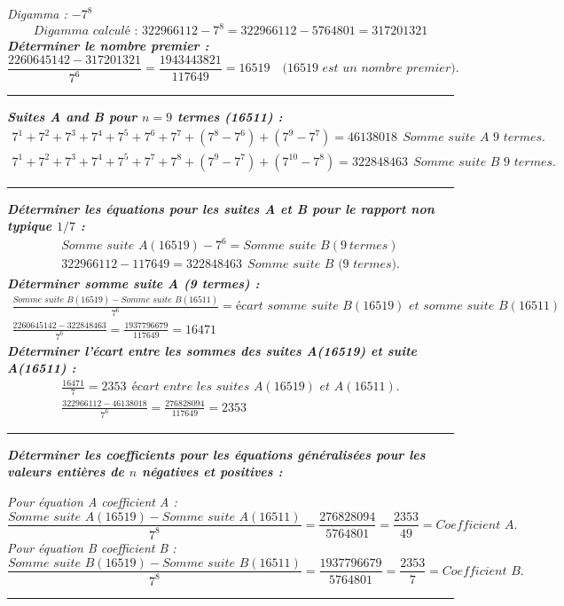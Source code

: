 \documentclass[11pt,a4paper]{article}
\begin{document}
\noindent\textit{Digamma : $-7^{8}$}
\[
\textit{Digamma calculé : }322966112-7^{8}=322966112-5764801=317201321
\]
\noindent\textbf{\textit{Déterminer le nombre premier :}}
\[
\frac{2260645142-317201321}{7^{6}}=\frac{1943443821}{117649}=16519\quad\textit{(16519 est un nombre premier).}
\]
\noindent\rule{\linewidth}{0.4pt}

\noindent\textbf{\textit{Suites A and B pour $n=9$ termes (16511) :}}
\begin{gather*}
7^{1}+7^{2}+7^{3}+7^{4}+7^{5}+7^{6}+7^{7}+(7^{8}-7^{6})+(7^{9}-7^{7})=46138018\ \ \textit{Somme suite A 9 termes.}\\
7^{1}+7^{2}+7^{3}+7^{4}+7^{5}+7^{7}+7^{8}+(7^{9}-7^{7})+(7^{10}-7^{8})=322848463\ \ \textit{Somme suite B 9 termes.}
\end{gather*}
\noindent\rule{\linewidth}{0.4pt}

\noindent\textbf{\textit{Déterminer les équations pour les suites A et B pour le rapport non typique $1/7$ :}}
\begin{gather*}
\textit{Somme suite A}(16519)-7^{6}=\textit{Somme suite B}(9\ \textit{termes})\\
322966112-117649=322848463\ \ \textit{Somme suite B (9 termes).}
\end{gather*}
\noindent\textbf{\textit{Déterminer somme suite A (9 termes) :}}
\begin{gather*}
\frac{\textit{Somme suite B}(16519)-\textit{Somme suite B}(16511)}{7^{6}}=\textit{écart somme suite B}(16519)\textit{ et somme suite B}(16511)\\
\frac{2260645142-322848463}{7^{6}}=\frac{1937796679}{117649}=16471
\end{gather*}
\noindent\textbf{\textit{Déterminer l’écart entre les sommes des suites A(16519) et suite A(16511) :}}
\begin{gather*}
\frac{16471}{7}=2353\ \ \textit{écart entre les suites A}(16519)\textit{ et A}(16511).\\
\frac{322966112-46138018}{7^{6}}=\frac{276828094}{117649}=2353
\end{gather*}
\noindent\rule{\linewidth}{0.4pt}

\noindent\textbf{\textit{Déterminer les coefficients pour les équations généralisées pour les valeurs entières de $n$ négatives et positives :}}

\noindent\textit{Pour équation A coefficient A :}
\[
\frac{\textit{Somme suite A}(16519)-\textit{Somme suite A}(16511)}{7^{8}}=\frac{276828094}{5764801}=\frac{2353}{49}=\textit{Coefficient A.}
\]
\noindent\textit{Pour équation B coefficient B :}
\[
\frac{\textit{Somme suite B}(16519)-\textit{Somme suite B}(16511)}{7^{8}}=\frac{1937796679}{5764801}=\frac{2353}{7}=\textit{Coefficient B.}
\]
\noindent\rule{\linewidth}{0.4pt}
\end{document}
